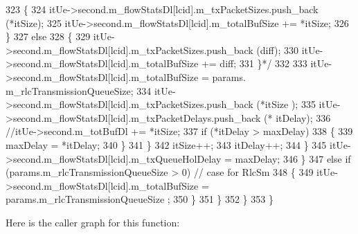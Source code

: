 \begin{DoxyCode}
323 \textcolor{comment}{                                        \{}
324 \textcolor{comment}{                                                itUe->second.m\_flowStatsDl[lcid].m\_txPacketSizes.push\_back
       (*itSize);}
325 \textcolor{comment}{                                                itUe->second.m\_flowStatsDl[lcid].m\_totalBufSize += *itSize;}
326 \textcolor{comment}{                                        \}}
327 \textcolor{comment}{                                        else}
328 \textcolor{comment}{                                        \{}
329 \textcolor{comment}{                                                itUe->second.m\_flowStatsDl[lcid].m\_txPacketSizes.push\_back
       (diff);}
330 \textcolor{comment}{                                                itUe->second.m\_flowStatsDl[lcid].m\_totalBufSize += diff;}
331 \textcolor{comment}{                                        \}*/}
332 
333                                         itUe->second.m\_flowStatsDl[lcid].m\_totalBufSize = params.
      m\_rlcTransmissionQueueSize;
334                                         itUe->second.m\_flowStatsDl[lcid].m\_txPacketSizes.push\_back (*itSize
      );
335                                         itUe->second.m\_flowStatsDl[lcid].m\_txPacketDelays.push\_back (*
      itDelay);
336                                         \textcolor{comment}{//itUe->second.m\_totBufDl += *itSize;}
337                                         \textcolor{keywordflow}{if} (*itDelay > maxDelay)
338                                         \{
339                                                 maxDelay = *itDelay;
340                                         \}
341                                 \}
342                                 itSize++;
343                                 itDelay++;
344                         \}
345                         itUe->second.m\_flowStatsDl[lcid].m\_txQueueHolDelay = maxDelay;
346                 \}
347                 \textcolor{keywordflow}{else} \textcolor{keywordflow}{if} (params.m\_rlcTransmissionQueueSize > 0)  \textcolor{comment}{// case for RlcSm}
348                 \{
349                         itUe->second.m\_flowStatsDl[lcid].m\_totalBufSize = params.m\_rlcTransmissionQueueSize
      ;
350                 \}
351         \}
352   \}
353 \}
\end{DoxyCode}


Here is the caller graph for this function\+:


